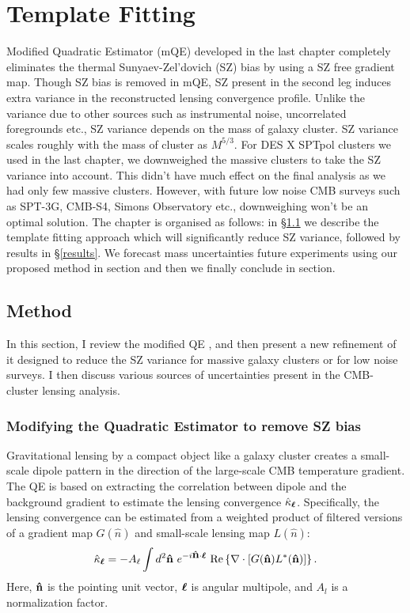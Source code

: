 \chapter{Template Fitting}
\label{ch:template}

Modified Quadratic Estimator (mQE) developed in the last chapter completely eliminates the thermal Sunyaev-Zel'dovich (SZ) bias by using a SZ free gradient map. 
Though SZ bias is removed in mQE, SZ present in the second leg induces extra variance in the reconstructed lensing convergence profile. 
Unlike the variance due to other sources such as instrumental noise, uncorrelated foregrounds etc., SZ variance depends on the mass of galaxy cluster.
SZ variance scales roughly with the mass of cluster as $M^{5/3}$.
For DES X SPTpol clusters we used in the last chapter, we downweighed the massive clusters to take the SZ variance into account. 
This didn't have much effect on the final analysis as we had only few massive clusters. 
However, with future low noise CMB surveys such as SPT-3G, CMB-S4, Simons Observatory etc., downweighing won't be an optimal solution.
The chapter is organised as follows: in  \S\ref{sec_methods} we describe the template fitting approach which will significantly reduce SZ variance, followed by results in \S\ref{results}. 
We forecast mass uncertainties future experiments using our proposed method in section and then we finally conclude in section.
\section{Method}
\label{sec_methods}
In this section, I review the modified QE \citep{madhavacheril18, raghunathan18}, and then present a new refinement  of it designed to reduce the SZ variance for massive galaxy clusters or for low noise surveys. 
I then discuss various sources of uncertainties present in the CMB-cluster lensing analysis. 


\subsection{Modifying the Quadratic Estimator to remove SZ bias}
\label{sec_mQE}


Gravitational lensing by a compact object like a galaxy cluster creates a small-scale dipole pattern in the direction of the large-scale CMB temperature gradient. 
The QE \citep{hu02a} is based on extracting the correlation between dipole and the background gradient to estimate the lensing convergence $\hat{\kappa}_{\bm{\ell}}$. 
Specifically, the lensing convergence can be estimated from a weighted product of filtered versions of a gradient map $G(\hat{n})$ and  small-scale lensing map $L(\hat{n})$: 
\begin{equation}
\hat{\kappa}_{\bm{\ell}} = -A_{\ell} \int d^{2}\bm{\hat{\mbox{n}}}\ e^{-i\bm{\hat{\mbox{n}}}\cdot\bm{\ell}}\ {\rm Re} \left\{ \nabla \cdot \left[ G(\bm{\hat{\mbox{n}}}) L^{*}(\bm{\hat{\mbox{n}}})\right]\right\}.
\label{eq_QE_kappa}
\end{equation} 
Here, $\bm{\hat{\mbox{n}}}$ is the pointing unit vector, $\bm{\ell}$ is angular multipole, and $A_{l}$ is a normalization factor. 


